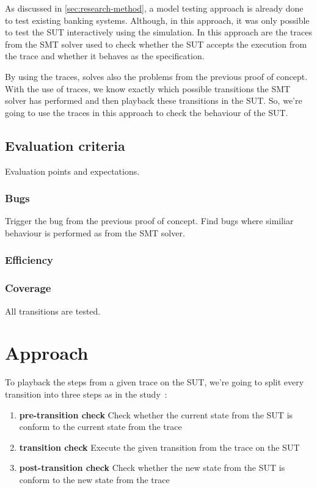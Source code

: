 As discussed in \autoref{sec:research-method}, a model testing approach is
already done to test existing banking systems. Although, in this approach, it
was only possible to test the SUT interactively using the simulation. In this
approach are the traces from the SMT solver used to check whether the
SUT accepts the execution from the trace and whether it behaves as the
specification.~\cite[p.5]{stoel_storm_vinju_bosman_2016}

By using the traces, solves also the problems from the previous proof of
concept. With the use of traces, we know exactly which possible transitions the
SMT solver has performed and then playback these transitions in the SUT. So,
we're going to use the traces in this approach to check the behaviour of the
SUT.

\subsection{Evaluation criteria}
Evaluation points and expectations.

\subsubsection{Bugs}
Trigger the bug from the previous proof of concept. Find bugs where similiar
behaviour is performed as from the SMT solver.

\subsubsection{Efficiency}


\subsubsection{Coverage}
All transitions are tested.


\section{Approach}
To playback the steps from a given trace on the SUT, we're going to split every
transition into three steps as in the
study~\cite[p.~6]{stoel_storm_vinju_bosman_2016}:
\begin{enumerate}
\item \textbf{pre-transition check} Check whether the current state from the SUT
is conform to the current state from the trace
\item \textbf{transition check} Execute the given transition from the trace on
the SUT
\item \textbf{post-transition check} Check whether the new state from the SUT is
conform to the new state from the trace
\end{enumerate}

